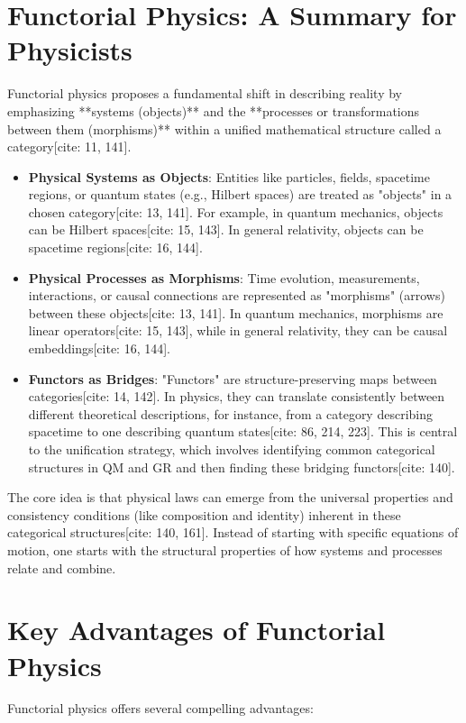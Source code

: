 \documentclass[11pt,a4paper]{article}
\begin{document}
\section{Functorial Physics: A Summary for Physicists}
Functorial physics proposes a fundamental shift in describing reality by emphasizing **systems (objects)** and the **processes or transformations between them (morphisms)** within a unified mathematical structure called a category[cite: 11, 141].

\begin{itemize}
    \item \textbf{Physical Systems as Objects}: Entities like particles, fields, spacetime regions, or quantum states (e.g., Hilbert spaces) are treated as "objects" in a chosen category[cite: 13, 141]. For example, in quantum mechanics, objects can be Hilbert spaces[cite: 15, 143]. In general relativity, objects can be spacetime regions[cite: 16, 144].
    \item \textbf{Physical Processes as Morphisms}: Time evolution, measurements, interactions, or causal connections are represented as "morphisms" (arrows) between these objects[cite: 13, 141]. In quantum mechanics, morphisms are linear operators[cite: 15, 143], while in general relativity, they can be causal embeddings[cite: 16, 144].
    \item \textbf{Functors as Bridges}: "Functors" are structure-preserving maps between categories[cite: 14, 142]. In physics, they can translate consistently between different theoretical descriptions, for instance, from a category describing spacetime to one describing quantum states[cite: 86, 214, 223]. This is central to the unification strategy, which involves identifying common categorical structures in QM and GR and then finding these bridging functors[cite: 140].
\end{itemize}
The core idea is that physical laws can emerge from the universal properties and consistency conditions (like composition and identity) inherent in these categorical structures[cite: 140, 161]. Instead of starting with specific equations of motion, one starts with the structural properties of how systems and processes relate and combine.

\section{Key Advantages of Functorial Physics}

Functorial physics offers several compelling advantages:
\end{document}
